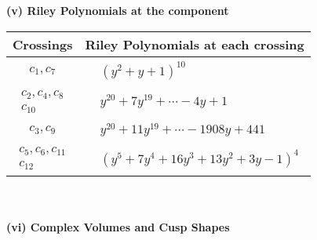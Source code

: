 \documentclass[1p]{elsarticle_modified}
\theoremstyle{definition}
\begin{document}
\newpage\renewcommand{\arraystretch}{1}
\flushleft \textbf{(v) Riley Polynomials at the component}\newline \\
\begin{tabular}{m{50pt}|m{274pt}}
Crossings & \hspace{64pt}Riley Polynomials at each crossing \\
\hline $$\begin{aligned}c_{1},c_{7}\end{aligned}$$&$\begin{aligned}
&(y^2+y+1)^{10}
\end{aligned}$\\
\hline $$\begin{aligned}c_{2},c_{4},c_{8}\\c_{10}\end{aligned}$$&$\begin{aligned}
&y^{20}+7 y^{19}+\cdots-4 y+1
\end{aligned}$\\
\hline $$\begin{aligned}c_{3},c_{9}\end{aligned}$$&$\begin{aligned}
&y^{20}+11 y^{19}+\cdots-1908 y+441
\end{aligned}$\\
\hline $$\begin{aligned}c_{5},c_{6},c_{11}\\c_{12}\end{aligned}$$&$\begin{aligned}
&(y^5+7 y^4+16 y^3+13 y^2+3 y-1)^4
\end{aligned}$\\
\hline
\end{tabular}\\~\\
\newpage\flushleft \textbf{(vi) Complex Volumes and Cusp Shapes}
\end{document}
